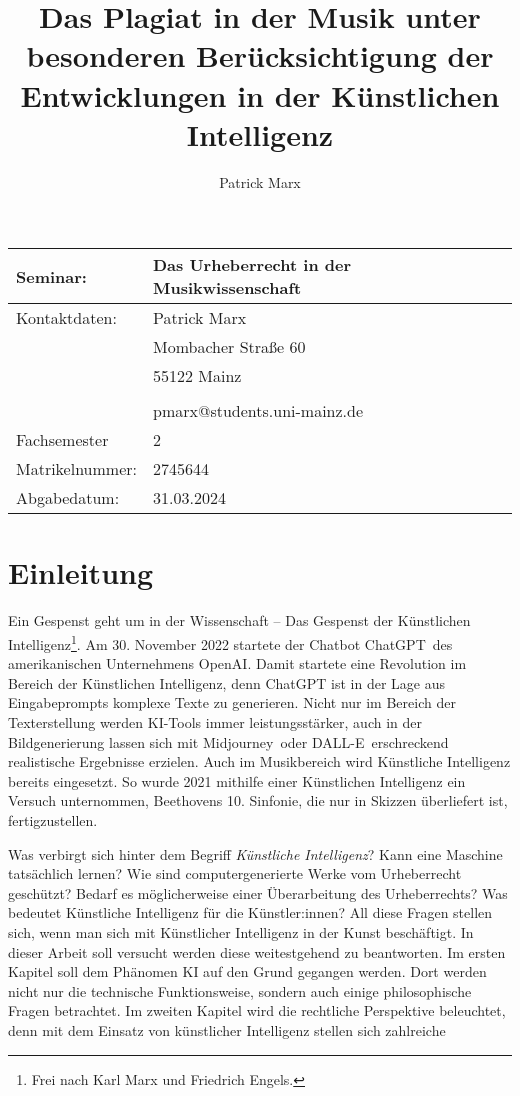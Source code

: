 \documentclass{article}
\title{Das Plagiat in der Musik unter besonderen Berücksichtigung der Entwicklungen in der Künstlichen Intelligenz}
\author{Patrick Marx}
\begin{document}
\maketitle

\begin{tabular}[b]{l|l}
  Seminar: & Das Urheberrecht in der Musikwissenschaft \\
  \hline
  Kontaktdaten: & Patrick Marx \\
                & Mombacher Straße 60 \\
                & 55122 Mainz \\
                & \\
                & pmarx@students.uni-mainz.de \\
                \hline
  Fachsemester & 2 \\
  Matrikelnummer: & 2745644 \\
  Abgabedatum: & 31.03.2024 \\
\end{tabular}
\thispagestyle{empty}
\newpage

\tableofcontents
\thispagestyle{empty}
\newpage

\setcounter{page}{1}
\section{Einleitung}
Ein Gespenst geht um in der Wissenschaft -- Das Gespenst der Künstlichen Intelligenz\footnote{Frei nach Karl Marx und Friedrich Engels.}. Am 30. November 2022 startete der Chatbot \glqq ChatGPT\grqq~des amerikanischen Unternehmens OpenAI\autocite{schnabelKuenstlicheIntelligenzHausaufgaben2022}. 
Damit startete eine Revolution im Bereich der Künstlichen Intelligenz, denn ChatGPT ist in der Lage aus Eingabeprompts komplexe Texte zu generieren. 
Nicht nur im Bereich der Texterstellung werden KI-Tools immer leistungsstärker, 
auch in der Bildgenerierung lassen sich mit \glqq Midjourney\grqq~oder \glqq DALL-E\grqq~erschreckend realistische Ergebnisse erzielen. 
Auch im Musikbereich wird Künstliche Intelligenz bereits eingesetzt. 
So wurde 2021 mithilfe einer Künstlichen Intelligenz ein Versuch unternommen, Beethovens 10. Sinfonie, die nur in Skizzen überliefert ist, fertigzustellen\autocite{dpaMusikKuenstlicheIntelligenz2021}.

Was verbirgt sich hinter dem Begriff \glqq\textit{Künstliche Intelligenz}\grqq?
Kann eine Maschine tatsächlich lernen? Wie sind computergenerierte Werke vom 
Urheberrecht geschützt? Bedarf es möglicherweise einer Überarbeitung des 
Urheberrechts? Was bedeutet Künstliche Intelligenz für die Künstler:innen? 
All diese Fragen stellen sich, wenn man sich mit Künstlicher Intelligenz in der Kunst beschäftigt. In dieser Arbeit soll versucht werden diese weitestgehend zu beantworten. 
Im ersten Kapitel soll dem Phänomen KI auf den Grund gegangen werden. Dort werden nicht nur die technische Funktionsweise, sondern auch einige philosophische Fragen betrachtet. 
Im zweiten Kapitel wird die rechtliche Perspektive beleuchtet, denn mit dem Einsatz von künstlicher Intelligenz stellen sich zahlreiche
\end{document}

